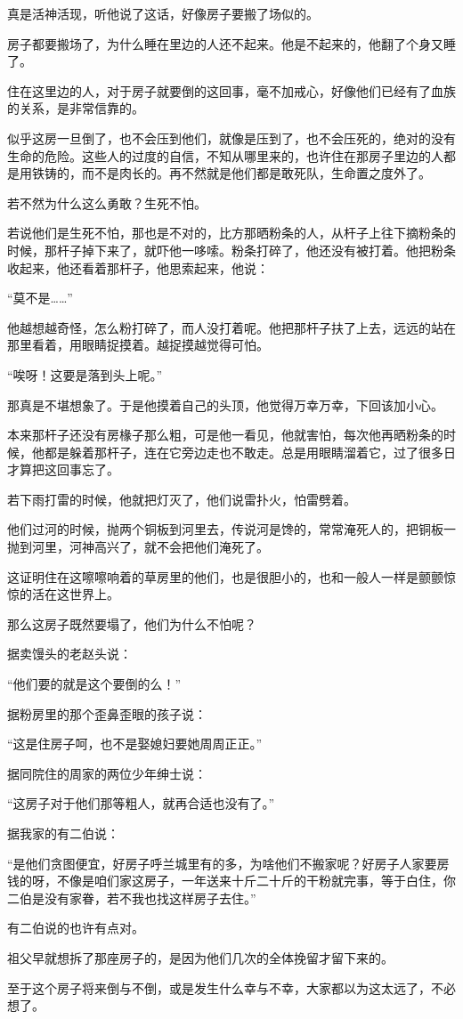 \par 真是活神活现，听他说了这话，好像房子要搬了场似的。
\par 房子都要搬场了，为什么睡在里边的人还不起来。他是不起来的，他翻了个身又睡了。
\par 住在这里边的人，对于房子就要倒的这回事，毫不加戒心，好像他们已经有了血族的关系，是非常信靠的。
\par 似乎这房一旦倒了，也不会压到他们，就像是压到了，也不会压死的，绝对的没有生命的危险。这些人的过度的自信，不知从哪里来的，也许住在那房子里边的人都是用铁铸的，而不是肉长的。再不然就是他们都是敢死队，生命置之度外了。
\par 若不然为什么这么勇敢？生死不怕。
\par 若说他们是生死不怕，那也是不对的，比方那晒粉条的人，从杆子上往下摘粉条的时候，那杆子掉下来了，就吓他一哆嗦。粉条打碎了，他还没有被打着。他把粉条收起来，他还看着那杆子，他思索起来，他说：
\par “莫不是……”
\par 他越想越奇怪，怎么粉打碎了，而人没打着呢。他把那杆子扶了上去，远远的站在那里看着，用眼睛捉摸着。越捉摸越觉得可怕。
\par “唉呀！这要是落到头上呢。”
\par 那真是不堪想象了。于是他摸着自己的头顶，他觉得万幸万幸，下回该加小心。
\par 本来那杆子还没有房椽子那么粗，可是他一看见，他就害怕，每次他再晒粉条的时候，他都是躲着那杆子，连在它旁边走也不敢走。总是用眼睛溜着它，过了很多日才算把这回事忘了。
\par 若下雨打雷的时候，他就把灯灭了，他们说雷扑火，怕雷劈着。
\par 他们过河的时候，抛两个铜板到河里去，传说河是馋的，常常淹死人的，把铜板一抛到河里，河神高兴了，就不会把他们淹死了。
\par 这证明住在这嚓嚓响着的草房里的他们，也是很胆小的，也和一般人一样是颤颤惊惊的活在这世界上。
\par 那么这房子既然要塌了，他们为什么不怕呢？
\par 据卖馒头的老赵头说：
\par “他们要的就是这个要倒的么！”
\par 据粉房里的那个歪鼻歪眼的孩子说：
\par “这是住房子呵，也不是娶媳妇要她周周正正。”
\par 据同院住的周家的两位少年绅士说：
\par “这房子对于他们那等粗人，就再合适也没有了。”
\par 据我家的有二伯说：
\par “是他们贪图便宜，好房子呼兰城里有的多，为啥他们不搬家呢？好房子人家要房钱的呀，不像是咱们家这房子，一年送来十斤二十斤的干粉就完事，等于白住，你二伯是没有家眷，若不我也找这样房子去住。”
\par 有二伯说的也许有点对。
\par 祖父早就想拆了那座房子的，是因为他们几次的全体挽留才留下来的。
\par 至于这个房子将来倒与不倒，或是发生什么幸与不幸，大家都以为这太远了，不必想了。
